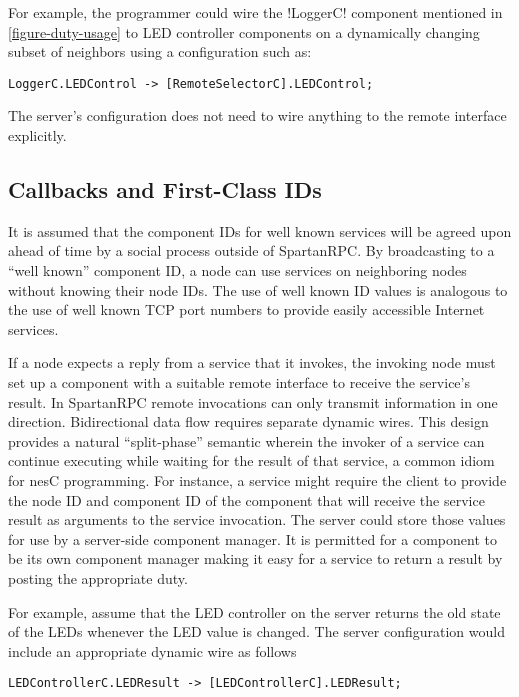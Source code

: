 For example, the programmer could wire the !LoggerC! component mentioned in
\autoref{figure-duty-usage} to LED controller components on a dynamically changing subset of
neighbors using a configuration such as:
\begin{lstlisting}
LoggerC.LEDControl -> [RemoteSelectorC].LEDControl;
\end{lstlisting}

The server's configuration does not need to wire anything to the remote interface explicitly.

\subsection{Callbacks and First-Class IDs}

It is assumed that the component IDs for well known services will be agreed upon ahead of time by a
social process outside of SpartanRPC. By broadcasting to a ``well known'' component ID, a node
can use services on neighboring nodes without knowing their node IDs. The use of well known ID
values is analogous to the use of well known TCP port numbers to provide easily accessible
Internet services.

If a node expects a reply from a service that it invokes, the invoking node must set up a
component with a suitable remote interface to receive the service's result. In SpartanRPC remote
invocations can only transmit information in one direction. Bidirectional data flow requires
separate dynamic wires. This design provides a natural ``split-phase'' semantic wherein the
invoker of a service can continue executing while waiting for the result of that service, a
common idiom for nesC programming. For instance, a service might require the client to provide
the node ID and component ID of the component that will receive the service result as arguments
to the service invocation. The server could store those values for use by a server-side
component manager. It is permitted for a component to be its own component manager making it
easy for a service to return a result by posting the appropriate duty.

For example, assume that the LED controller on the server returns the old state of the LEDs
whenever the LED value is changed. The server configuration would include an appropriate
dynamic wire as follows
\begin{lstlisting}
LEDControllerC.LEDResult -> [LEDControllerC].LEDResult;
\end{lstlisting}

